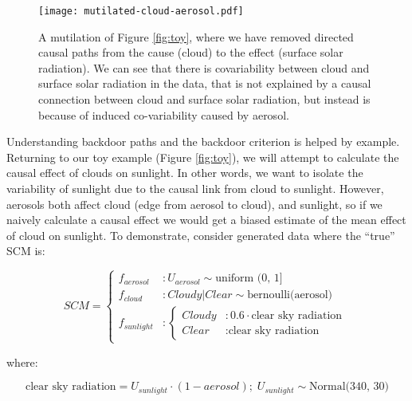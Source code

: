 \documentclass[12pt]{article}
\begin{document}
\begin{figure}
  \noindent\texttt{[image: mutilated-cloud-aerosol.pdf]}\\
  \caption{A mutilation of Figure \ref{fig:toy}, where we have removed
    directed causal paths from the cause (cloud) to the effect (surface
    solar radiation). We can see that there is covariability between
    cloud and surface solar radiation in the data, that is not
    explained by a causal connection between cloud and surface solar
    radiation, but instead is because of induced co-variability caused
    by aerosol.}
  \label{fig:mutilated-toy}
\end{figure}

Understanding backdoor paths and the backdoor criterion is helped by
example. Returning to our toy example (Figure \ref{fig:toy}), we will
attempt to calculate the causal effect of clouds on sunlight. In other
words, we want to isolate the variability of sunlight due to the
causal link from cloud to sunlight. However, aerosols both affect
cloud (edge from aerosol to cloud), and sunlight, so if we naively
calculate a causal effect we would get a biased estimate of the mean
effect of cloud on sunlight. To demonstrate, consider generated
data where the ``true'' SCM is:

\begin{equation}
  SCM =
  \begin{cases}
    f_{aerosol} &: U_{aerosol} \sim \text{uniform (0, 1]}\\
    f_{cloud} &: Cloudy | Clear \sim \text{bernoulli(aerosol)}     \\
    f_{sunlight} &: \begin{cases}
      Cloudy &: 0.6 \cdot \text{clear sky radiation}  \\
      Clear &: \text{clear sky radiation}
    \end{cases}
  \end{cases}
\end{equation}

where:

\begin{equation*}
  \text{clear sky radiation} = U_{sunlight} \cdot (1 - aerosol); \;
  U_{sunlight} \sim \text{Normal(340, 30)}
\end{equation*}
\end{document}
